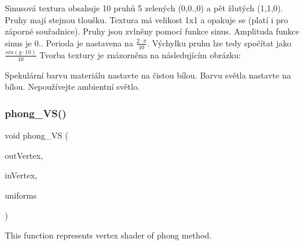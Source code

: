 Sinusová textura obsahuje 10 pruhů 5 zelených (0,0.,0) a pět žlutých (1,1,0). Pruhy mají stejnou tloušku. Textura má velikost 1x1 a opakuje se (platí i pro záporné souřadnice). Pruhy jsou zvlněny pomocí funkce sinus. Amplituda funkce sinus je 0.. Perioda je nastavena na $ \frac{2 \cdot \pi}{10} $. Výchylku pruhu lze tedy spočítat jako $ \frac{sin(y \cdot 10)}{10} $ Tvorba textury je znázorněna na následujícím obrázku\+:



Spekulární barvu materiálu nastavte na čistou bílou. Barvu světla nastavte na bílou. Nepoužívejte ambientní světlo.~\newline


 \mbox{\label{group__shader__side_ga128e1d2afb1e73269e5a1d4eaf4c23cb}} 
\subsubsection{\texorpdfstring{phong\+\_\+\+V\+S()}{phong\_VS()}}
{\footnotesize\ttfamily void phong\+\_\+\+VS (\begin{DoxyParamCaption}\item[{\hyperlink{structOutVertex}{Out\+Vertex} \&}]{out\+Vertex,  }\item[{\hyperlink{structInVertex}{In\+Vertex} const \&}]{in\+Vertex,  }\item[{\hyperlink{structUniforms}{Uniforms} const \&}]{uniforms }\end{DoxyParamCaption})}



This function represents vertex shader of phong method. 


